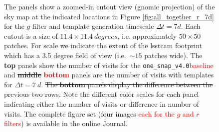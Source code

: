 \documentclass[preprintm,linenumbers]{aastex631}
\newcommand{\baseline}{\texttt{one\_snap\_v4.0}\xspace}
\providecommand{\red}[1]{\textcolor{red}{#1}}
\begin{document}
\begin{figure}
\begin{tabular}{@{}c@{}c@{}}
			\end{tabular}
			\caption{
				The panels show a zoomed-in cutout view (gnomic projection) of the sky map at the indicated locations in Figure \ref{fig:all_together_r_7d} for the $g$ filter and template generation timescale $\Delta t = 7 \si{d}$.
				Each cutout is a size of $11.4 \times 11.4\ \si{degrees}$, i.e. approximately $50 \times 50$ patches.
				For scale we indicate the extent of the \gls*{lsstcam} footprint which has a 3.5 degree field of view (i.e.\ $\sim15$ patches wide).
The \textbf{top} panels show the number of visits for the \baseline \red{baseline} and \sout{\textbf{middle}} \red{\textbf{bottom}} panels are the number of visits with templates for $\Delta t = 7\ \si{d}$.
\sout{The \textbf{bottom} panels display the difference between the previous two rows.}
				Note the different color scales for each panel indicating either the number of visits or difference in number of visits. 	
              The complete figure set (four images \red{each for the $g$ and $r$ filters}) is available in the online Journal. 
    }
	\label{fig:skymap_cutouts_g_7}
		\end{figure}
\end{document}
